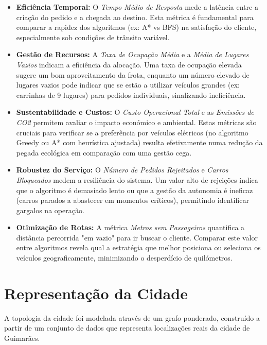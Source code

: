 \documentclass[11pt, a4paper, fleqn]{article}
\begin{document}
	\begin{itemize}
		\item \textbf{Eficiência Temporal:} O \textit{Tempo Médio de Resposta} mede a latência entre a criação do pedido e a chegada ao destino. Esta métrica é fundamental para comparar a rapidez dos algoritmos (ex: A* vs BFS) na satisfação do cliente, especialmente sob condições de trânsito variável.
		
		\item \textbf{Gestão de Recursos:} A \textit{Taxa de Ocupação Média} e a \textit{Média de Lugares Vazios} indicam a eficiência da alocação. Uma taxa de ocupação elevada sugere um bom aproveitamento da frota, enquanto um número elevado de lugares vazios pode indicar que se estão a utilizar veículos grandes (ex: carrinhas de 9 lugares) para pedidos individuais, sinalizando ineficiência.
		
		\item \textbf{Sustentabilidade e Custos:} O \textit{Custo Operacional Total} e as \textit{Emissões de CO2} permitem avaliar o impacto económico e ambiental. Estas métricas são cruciais para verificar se a preferência por veículos elétricos (no algoritmo Greedy ou A* com heurística ajustada) resulta efetivamente numa redução da pegada ecológica em comparação com uma gestão cega.
		
		\item \textbf{Robustez do Serviço:} O \textit{Número de Pedidos Rejeitados} e \textit{Carros Bloqueados} medem a resiliência do sistema. Um valor alto de rejeições indica que o algoritmo é demasiado lento ou que a gestão da autonomia é ineficaz (carros parados a abastecer em momentos críticos), permitindo identificar gargalos na operação.
		
		\item \textbf{Otimização de Rotas:} A métrica \textit{Metros sem Passageiros} quantifica a distância percorrida "em vazio" para ir buscar o cliente. Comparar este valor entre algoritmos revela qual a estratégia que melhor posiciona ou seleciona os veículos geograficamente, minimizando o desperdício de quilómetros.
	\end{itemize}
	
	\newpage
	
	\section{Representação da Cidade}
	
	A topologia da cidade foi modelada através de um grafo ponderado, construído a partir de um conjunto de dados que representa localizações reais da cidade de Guimarães.
	
\end{document}
